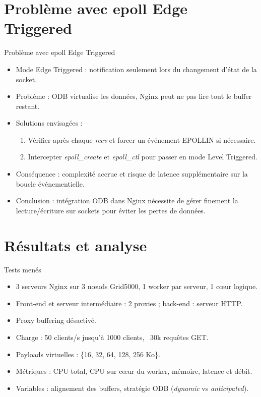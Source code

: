 \documentclass[aspectratio=43,8pt]{beamer}
\begin{document}
\section{Problème avec epoll Edge Triggered}
\begin{frame}{Problème avec epoll Edge Triggered}
\begin{card}
    \begin{itemize}
        \item Mode Edge Triggered : notification seulement lors du changement d’état de la socket.
        \item Problème : ODB virtualise les données, Nginx peut ne pas lire tout le buffer restant.
        \item Solutions envisagées :
        \begin{enumerate}
            \item Vérifier après chaque \textit{recv} et forcer un événement EPOLLIN si nécessaire.
            \item Intercepter \textit{epoll\_create} et \textit{epoll\_ctl} pour passer en mode Level Triggered.
        \end{enumerate}
        \item Conséquence : complexité accrue et risque de latence supplémentaire sur la boucle événementielle.
        \item Conclusion : intégration ODB dans Nginx nécessite de gérer finement la lecture/écriture sur sockets pour éviter les pertes de données.
    \end{itemize}
\end{card}
\end{frame}


\section{Résultats et analyse}

\begin{frame}{Tests menés}
\begin{card}
    \begin{itemize}
        \item 3 serveurs Nginx sur 3 nœuds Grid5000, 1 worker par serveur, 1 cœur logique.
        \item Front-end et serveur intermédiaire : 2 proxies ; back-end : serveur HTTP.
        \item Proxy buffering désactivé.
        \item Charge : 50 clients/s jusqu'à 1000 clients, ~30k requêtes GET.
        \item Payloads virtuelles : \{16, 32, 64, 128, 256 Ko\}.
        \item Métriques : CPU total, CPU sur cœur du worker, mémoire, latence et débit.
        \item Variables : alignement des buffers, stratégie ODB (\textit{dynamic} vs \textit{anticipated}).
    \end{itemize}
\end{card}
\end{frame}
\end{document}
